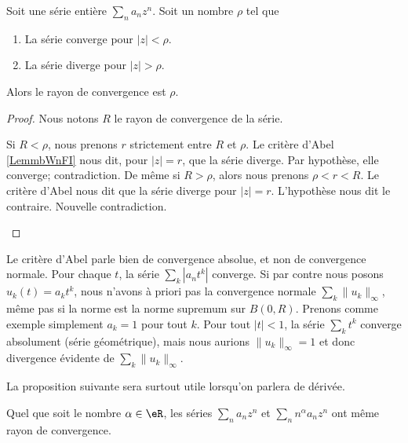 \begin{corollary}       \label{CORooCUDSooTfMvAB}
	Soit une série entière \( \sum_na_nz^n\). Soit un nombre \( \rho\) tel que
	\begin{enumerate}
		\item
		      La série converge pour \( | z |<\rho\).
		\item
		      La série diverge pour \( | z |>\rho\).
	\end{enumerate}
	Alors le rayon de convergence est \( \rho\).
\end{corollary}

\begin{proof}
	Nous notons \( R\) le rayon de convergence de la série.
	\begin{subproof}
		Si \( R<\rho\), nous prenons \( r\) strictement entre \( R\) et \( \rho\). Le critère d'Abel \ref{LemmbWnFI} nous dit, pour \( | z |=r\), que la série diverge. Par hypothèse, elle converge; contradiction.
		De même si \( R>\rho\), alors nous prenons \( \rho<r<R\). Le critère d'Abel nous dit que la série diverge pour \( | z |=r\). L'hypothèse nous dit le contraire. Nouvelle contradiction.
	\end{subproof}
\end{proof}

\begin{normaltext}
	Le critère d'Abel parle bien de convergence absolue, et non de convergence normale. Pour chaque \( t\), la série \( \sum_k | a_nt^k |\) converge. Si par contre nous posons \( u_k(t)=a_kt^k\), nous n'avons à priori pas la convergence normale \( \sum_k\| u_k \|_{\infty}\), même pas si la norme est la norme supremum sur \( B(0,R)\). Prenons comme exemple simplement \( a_k=1\) pour tout \( k\). Pour tout \( | t |<1\), la série \( \sum_k t^k\) converge absolument (série géométrique), mais nous aurions \( \| u_k \|_{\infty}=1\) et donc divergence évidente de \( \sum_k\| u_k \|_{\infty}\).
\end{normaltext}

La proposition suivante sera surtout utile lorsqu'on parlera de dérivée.
\begin{proposition}        \label{PropHDIUooKTbVSX}
	Quel que soit le nombre \( \alpha\in \eR\), les séries \( \sum_na_nz^n\) et \( \sum_nn^{\alpha}a_nz^n\) ont même rayon de convergence.
\end{proposition}

